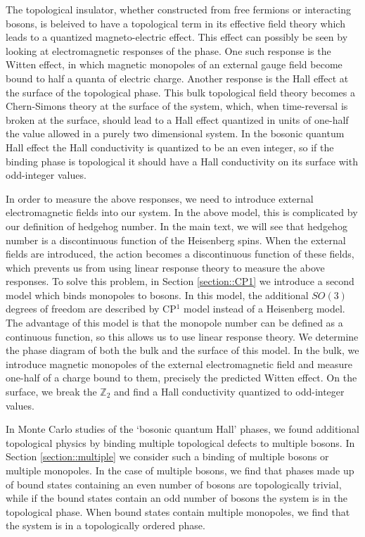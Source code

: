 \documentclass[prb,twocolumn]{revtex4-1}
\begin{document}
The topological insulator, whether constructed from free fermions or interacting bosons, is beleived to have a topological term in its effective field theory which leads to a quantized magneto-electric effect. This effect can possibly be seen by looking at electromagnetic responses of the phase. One such response is the Witten effect, in which magnetic monopoles of an external gauge field become bound to half a quanta of electric charge. Another response is the Hall effect at the surface of the topological phase. This bulk topological field theory becomes a Chern-Simons theory at the surface of the system, which, when time-reversal is broken at the surface, should lead to a Hall effect quantized in units of one-half the value allowed in a purely two dimensional system. In the bosonic quantum Hall effect the Hall conductivity is quantized to be an even integer, so if the binding phase is topological it should have a Hall conductivity on its surface with odd-integer values.

In order to measure the above responses, we need to introduce external electromagnetic fields into our system. In the above model, this is complicated by our definition of hedgehog number. In the main text, we will see that hedgehog number is a discontinuous function of the Heisenberg spins. When the external fields are introduced, the action becomes a discontinuous function of these fields, which prevents us from using linear response theory to measure the above responses. To solve this problem, in Section \ref{section::CP1} we introduce a second model which binds monopoles to bosons. In this model, the additional $SO(3)$ degrees of freedom are described by CP$^1$ model instead of a Heisenberg model. The advantage of this model is that the monopole number can be defined as a continuous function, so this allows us to use linear response theory. We determine the phase diagram of both the bulk and the surface of this model. In the bulk, we introduce magnetic monopoles of the external electromagnetic field and measure one-half of a charge bound to them, precisely the predicted Witten effect. On the surface, we break the $\mathbb{Z}_2$ and find a Hall conductivity quantized to odd-integer values. 

In Monte Carlo studies of the `bosonic quantum Hall' phases, we found additional topological physics by binding multiple topological defects to multiple bosons. In Section \ref{section::multiple} we consider such a binding of multiple bosons or multiple monopoles. In the case of multiple bosons, we find that phases made up of bound states containing an even number of bosons are topologically trivial, while if the bound states contain an odd number of bosons the system is in the topological phase. When bound states contain multiple monopoles, we find that the system is in a topologically ordered phase.
\end{document}
